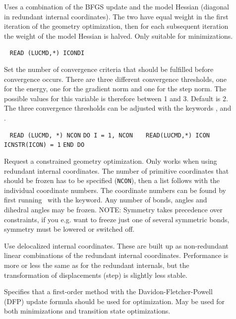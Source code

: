 \begin{description}
\item[]
Uses a combination of the BFGS update and the model Hessian (diagonal
in redundant internal coordinates). The two have equal weight in the
first iteration of the geometry optimization, then for each subsequent
iteration the weight of the model Hessian is halved. Only suitable for
minimizations.

\item[]\verb| |
\newline
\verb|READ (LUCMD,*) ICONDI|

Set the number of convergence criteria
that should be fulfilled before
convergence occurs. There are three different convergence thresholds,
one for the energy, one for the gradient
norm and one for the step
norm. The possible values for this variable is
therefore between 1 and
3. Default is 2. The three convergence thresholds can be adjusted with
the keywords ,  and .

\item[]\verb| |\newline
\verb|READ (LUCMD, *) NCON|\newline
\verb|DO I = 1, NCON|\newline
\verb|   READ(LUCMD,*) ICON|\newline
\verb|   ICNSTR(ICON) = 1|\newline
\verb|END DO|

Request a constrained geometry optimization. Only works when using
redundant internal coordinates. The number of primitive coordinates
that should be frozen has to be specified (\verb|NCON|), then a list
follows with the individual coordinate numbers. The coordinate numbers
can be found by first running \dalton\ with the 
keyword. Any number of bonds, angles and dihedral angles may be
frozen. NOTE: Symmetry takes precedence over constraints, if you
e.g. want to freeze just one of several symmetric bonds, symmetry
must be lowered or switched off.

\item[]
Use delocalized internal coordinates. These are built up as
non-redundant linear combinations of the redundant internal
coordinates. Performance is more or less the same as for the redundant
internals, but the transformation of displacements (step) is slightly
less stable.

\item[]
Specifies that a first-order method with the
Davidon-Fletcher-Powell (DFP) update formula should be used
for optimization. May be used for both minimizations and transition
state optimizations.


\end{description}
